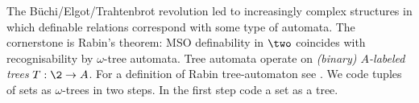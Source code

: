 The B\"uchi/Elgot/Trahtenbrot revolution led to increasingly complex
structures in which definable relations correspond with some type of automata. 
The cornerstone is Rabin's theorem: MSO definability in $\two$ coincides with recognisability by $\omega$-tree automata.
%
%
%
%
%
Tree automata operate on {\em (binary) $A$-labeled trees} $T:\2  \to A$. 
For a definition of Rabin tree-automaton see \cite{Thom90}. 
We code tuples of sets as $\omega$-trees in two steps. 
In the first step code a set as a tree.

